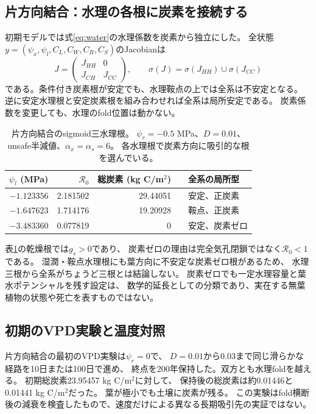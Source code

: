 \documentclass[a4paper,11pt]{ltjsarticle}
\begin{document}
\subsection{片方向結合：水理の各根に炭素を接続する}
初期モデルでは式\eqref{eq:water}の水理係数を炭素から独立にした。
全状態$y=(\psi_x,\psi_l,C_L,C_W,C_R,C_S)$のJacobianは
\begin{equation}\label{eq:triangular}
 J=\begin{pmatrix}J_{HH}&0\\J_{CH}&J_{CC}\end{pmatrix},\qquad
 \sigma(J)=\sigma(J_{HH})\cup\sigma(J_{CC})
\end{equation}
である。条件付き炭素根が安定でも、水理鞍点の上では全系は不安定となる。
逆に安定水理根と安定炭素根を組み合わせれば全系は局所安定である。
炭素係数を変更しても、水理のfold位置は動かない。

\begin{table}[tb]
\centering
\caption{片方向結合のsigmoid三水理根。
$\psi_r=-0.5$ MPa、$D=0.01$、unsafe半減値、$\alpha_x=\alpha_s=6$。
各水理根で炭素方向に吸引的な根を選んでいる。}\label{tab:sigcarbon}
\begin{tabular}{rrrrl}
\toprule
$\psi_l$ (MPa)&$\mathcal R_0$&総炭素 (kg C/m$^2$)& & 全系の局所型\\
\midrule
$-1.123356$ &2.181502&29.44051&&安定、正炭素\\
$-1.647623$ &1.714176&19.20928&&鞍点、正炭素\\
$-3.483360$ &0.077819&0&&安定、炭素ゼロ\\
\bottomrule
\end{tabular}
\end{table}
表\ref{tab:sigcarbon}の乾燥根では$g_s>0$であり、
炭素ゼロの理由は完全気孔閉鎖ではなく$\mathcal R_0<1$である。
湿潤・鞍点水理根にも葉方向に不安定な炭素ゼロ根があるため、
水理三根から全系がちょうど三根とは結論しない。
炭素ゼロでも一定水理容量と葉水ポテンシャルを残す設定は、
数学的延長としての分類であり、実在する無葉植物の状態や死亡を表すものではない。

\subsection{初期のVPD実験と温度対照}
片方向結合の最初のVPD実験は$\psi_r=0$で、
$D=0.01$から0.03まで同じ滑らかな経路を10日または100日で進め、
終点を200年保持した。双方とも水理foldを越える。
初期総炭素23.95457 kg C/m$^2$に対して、
保持後の総炭素は約0.01446と0.01441 kg C/m$^2$だった。
葉が極小でも土壌に炭素が残る。
この実験はfold横断後の減衰を検査したもので、速度だけによる異なる長期吸引先の実証ではない。
\end{document}
